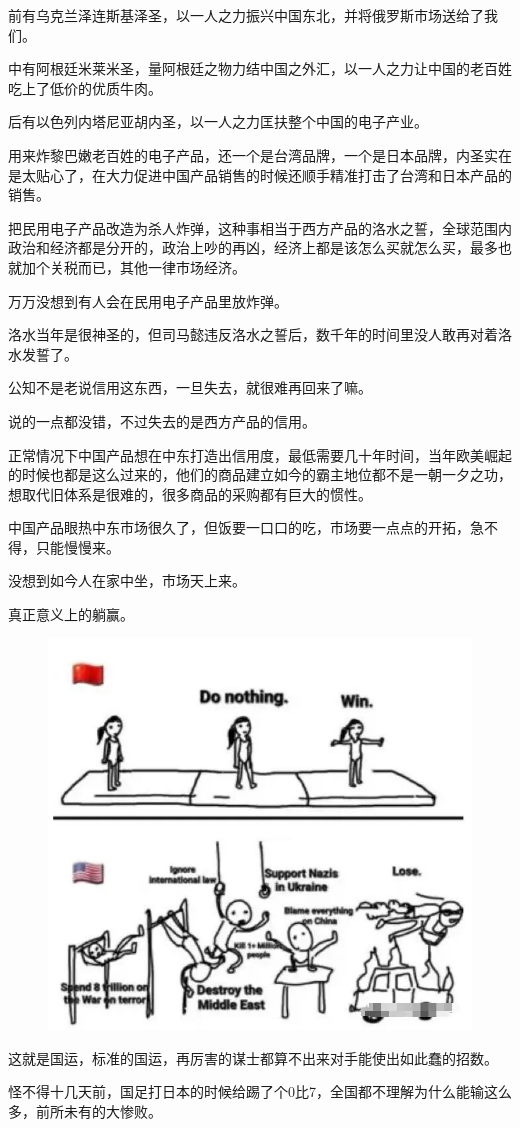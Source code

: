 \documentclass[UTF8,11pt,oneside]{ctexart}
\begin{document}

前有乌克兰泽连斯基泽圣，以一人之力振兴中国东北，并将俄罗斯市场送给了我们。

中有阿根廷米莱米圣，量阿根廷之物力结中国之外汇，以一人之力让中国的老百姓吃上了低价的优质牛肉。

后有以色列内塔尼亚胡内圣，以一人之力匡扶整个中国的电子产业。

用来炸黎巴嫩老百姓的电子产品，还一个是台湾品牌，一个是日本品牌，内圣实在是太贴心了，在大力促进中国产品销售的时候还顺手精准打击了台湾和日本产品的销售。

把民用电子产品改造为杀人炸弹，这种事相当于西方产品的洛水之誓，全球范围内政治和经济都是分开的，政治上吵的再凶，经济上都是该怎么买就怎么买，最多也就加个关税而已，其他一律市场经济。

万万没想到有人会在民用电子产品里放炸弹。

洛水当年是很神圣的，但司马懿违反洛水之誓后，数千年的时间里没人敢再对着洛水发誓了。

公知不是老说信用这东西，一旦失去，就很难再回来了嘛。

说的一点都没错，不过失去的是西方产品的信用。

正常情况下中国产品想在中东打造出信用度，最低需要几十年时间，当年欧美崛起的时候也都是这么过来的，他们的商品建立如今的霸主地位都不是一朝一夕之功，想取代旧体系是很难的，很多商品的采购都有巨大的惯性。

中国产品眼热中东市场很久了，但饭要一口口的吃，市场要一点点的开拓，急不得，只能慢慢来。

没想到如今人在家中坐，市场天上来。

真正意义上的躺赢。

\begin{figure}[H]
    \centering
    \includegraphics[width=12cm]{2024-09-21-007.jpg}
\end{figure}

这就是国运，标准的国运，再厉害的谋士都算不出来对手能使出如此蠢的招数。

怪不得十几天前，国足打日本的时候给踢了个0比7，全国都不理解为什么能输这么多，前所未有的大惨败。


\end{document}
